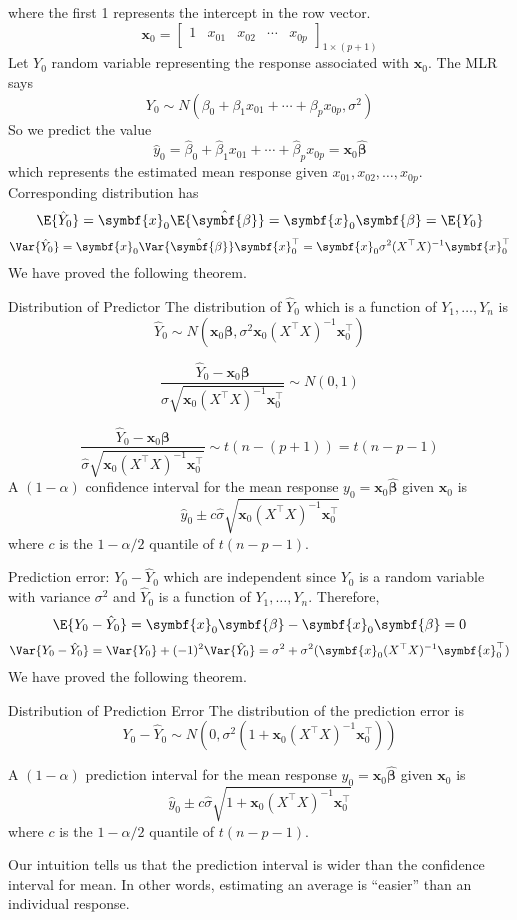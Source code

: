 where the first 1 represents the intercept in the row vector.
\[ \symbf{x}_0=\begin{bmatrix}
        1 & x_{01} & x_{02} & \cdots & x_{0p}
    \end{bmatrix}_{1\times (p+1)} \]
Let $ Y_0 $ random variable representing the response
associated with $ \symbf{x}_0 $. The MLR says
\[ Y_0 \sim N(\beta_0+\beta_1x_{01}+\cdots+\beta_p x_{0p},\sigma^2) \]
So we predict the value
\[ \hat{y}_0=\hat{\beta}_0+\hat{\beta}_1x_{01}+\cdots+
    \hat{\beta}_p x_{0p}=\symbf{x}_0\hat{\symbf{\beta}} \]
which represents the estimated mean response given
$ x_{01},x_{02},\ldots,x_{0p} $. Corresponding distribution
has
\[ \E{\hat{Y}_0}=\symbf{x}_0\E{\hat{\symbf{\beta}}}=\symbf{x}_0\symbf{\beta}
    =\E{Y_0} \]
\[ \Var{\hat{Y}_0}=\symbf{x}_0\Var{\hat{\symbf{\beta}}}\symbf{x}_0^\top=
    \symbf{x}_0\sigma^2(X^\top X)^{-1}\symbf{x}_0^\top \]
We have proved the following theorem.
\begin{Theorem}{Distribution of Predictor}{}
    The distribution of $ \hat{Y}_0 $ which is a function
    of $ Y_1,\ldots,Y_n $ is
    \[ \hat{Y}_0 \sim N(\symbf{x}_0\symbf{\beta},\sigma^2\symbf{x}_0(X^\top X)^{-1}
        \symbf{x}_0^\top) \]
\end{Theorem}
\[ \frac{\hat{Y}_0-\symbf{x}_0\symbf{\beta}}{\sigma\sqrt{
            \symbf{x}_0(X^\top X)^{-1}\symbf{x}_0^\top
        }}\sim N(0,1)  \]

\[ \frac{\hat{Y}_0-\symbf{x}_0\symbf{\beta}}{\hat{\sigma}\sqrt{
            \symbf{x}_0(X^\top X)^{-1}\symbf{x}_0^\top
        }}\sim t(n-(p+1))=t(n-p-1)  \]
A $ (1-\alpha) $ confidence interval for the mean
response $ y_0=\symbf{x}_0\hat{\symbf{\beta}} $ given $ \symbf{x}_0 $ is
\[ \hat{y}_0\pm c \hat{\sigma}\sqrt{
        \symbf{x}_0(X^\top X)^{-1}\symbf{x}_0^\top} \]
where $ c $ is the $ 1-\alpha/2 $ quantile of $ t(n-p-1) $.

Prediction error: $ Y_0-\hat{Y}_0 $ which are independent
since $ Y_0 $ is a random variable with variance $ \sigma^2 $
and $ \hat{Y}_0 $ is a function of $ Y_1,\ldots,Y_n $. Therefore,
\[ \E{Y_0-\hat{Y}_0}=\symbf{x}_0\symbf{\beta}-\symbf{x}_0\symbf{\beta}=0 \]
\[ \Var{Y_0-\hat{Y}_0}=\Var{Y_0}+(-1)^2\Var{\hat{Y}_0}=
    \sigma^2+\sigma^2(\symbf{x}_0(X^\top X)^{-1}\symbf{x}_0^\top) \]
We have proved the following theorem.
\begin{Theorem}{Distribution of Prediction Error}{}
    The distribution of the prediction error is
    \[ Y_0-\hat{Y}_0 \sim N(
        0,\sigma^2(1+\symbf{x}_0(X^\top X)^{-1}\symbf{x}_0^\top)
        ) \]
\end{Theorem}

A $ (1-\alpha) $ prediction interval for the mean
response $ y_0=\symbf{x}_0\hat{\symbf{\beta}} $ given $ \symbf{x}_0 $ is
\[ \hat{y}_0\pm c\hat{\sigma}\sqrt{1+\symbf{x}_0(X^\top X)^{-1}\symbf{x}_0^\top} \]
where $ c $ is the $ 1-\alpha/2 $ quantile of $ t(n-p-1) $.

\begin{Remark}{}{}
    Our intuition tells us that the prediction interval is wider than
    the confidence interval for mean. In other words, estimating
    an average is ``easier'' than an individual response.
\end{Remark}
